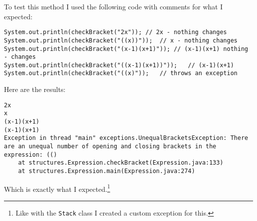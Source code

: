 \documentclass[../../../../main.tex]{subfiles}
\begin{document}
\newpage\noindent
To test this method I used the following code with comments for what I expected:
\begin{verbatim}
System.out.println(checkBracket("2x"));	// 2x - nothing changes
System.out.println(checkBracket("((x))"));	// x - nothing changes
System.out.println(checkBracket("(x-1)(x+1)"));	// (x-1)(x+1) nothing - changes
System.out.println(checkBracket("((x-1)(x+1))"));	// (x-1)(x+1)
System.out.println(checkBracket("((x)"));	// throws an exception
\end{verbatim}
Here are the results:
\begin{verbatim}
2x
x
(x-1)(x+1)
(x-1)(x+1)
Exception in thread "main" exceptions.UnequalBracketsException: There are an unequal number of opening and closing brackets in the expression: (()
	at structures.Expression.checkBracket(Expression.java:133)
	at structures.Expression.main(Expression.java:274)
\end{verbatim}
Which is exactly what I expected.\footnote{Like with the \texttt{Stack} class I  created a custom exception for this.}
\newpage
\end{document}
